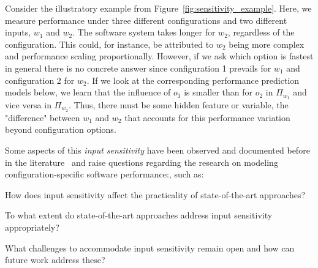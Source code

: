 {{ Consider the illustratory example from Figure~\ref{fig:sensitivity_example}. Here, we measure performance under three different configurations and two different inputs, $w_1$ and $w_2$. The software system takes longer for $w_2$, regardless of the configuration. This could, for instance, be attributed to $w_2$ being more complex and performance scaling proportionally. However, if we ask which option is fastest in general there is no concrete answer since configuration 1 prevails for $w_1$ and configuration 2 for $w_2$. If we look at the corresponding performance prediction models below, we learn that the influence of $o_1$ is smaller than for $o_2$ in $\Pi_{w_1}$ and vice versa in $\Pi_{w_2}$. Thus, there must be some hidden feature or variable, the "difference" between $w_1$ and $w_2$ that accounts for this performance variation beyond configuration options.
}


{
\color{edited}
	Some aspects of this \emph{input sensitivity} have been observed and documented before in the literature~\cite{liao_2020_using_emse,alves_sampling_2020,jamishidi_transfer_2017} and raise questions regarding the research on modeling configuration-specific software performance:, such as:
\begin{compactitem}
	\item How does input sensitivity affect the practicality of state-of-the-art approaches?
	\item To what extent do state-of-the-art approaches address input sensitivity appropriately?
	\item What  challenges to accommodate input sensitivity remain open and how can future work address these?
\end{compactitem}

}}
